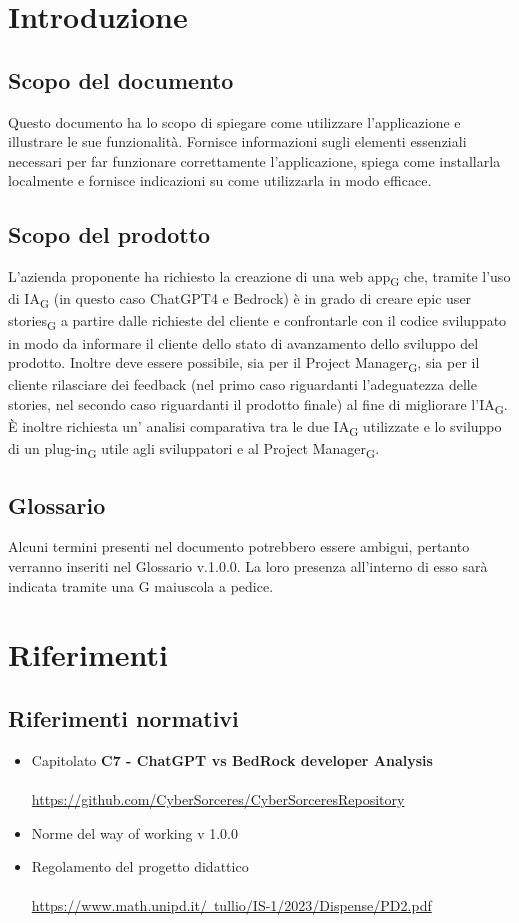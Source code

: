 \documentclass{article}
\begin{document}
{\section{Introduzione}
\subsection{Scopo del documento}
Questo documento ha lo scopo di spiegare come utilizzare l'applicazione e illustrare le sue funzionalità. Fornisce informazioni sugli elementi essenziali necessari per far funzionare correttamente l'applicazione, spiega come installarla localmente e fornisce indicazioni su come utilizzarla in modo efficace.
\subsection{Scopo del prodotto}
L'azienda proponente ha richiesto la creazione di una web app\textsubscript{G} che, tramite l'uso di IA\textsubscript{G} (in questo caso ChatGPT4 e Bedrock) è in grado di creare epic user stories\textsubscript{G} a partire dalle richieste del cliente e confrontarle con il codice sviluppato in modo da informare il cliente dello stato di avanzamento dello sviluppo del prodotto. Inoltre deve essere possibile, sia per il Project Manager\textsubscript{G}, sia per il cliente rilasciare dei feedback (nel primo caso riguardanti l'adeguatezza delle stories, nel secondo caso riguardanti il prodotto finale) al fine di migliorare l'IA\textsubscript{G}. È inoltre richiesta un' analisi comparativa tra le due IA\textsubscript{G} utilizzate e lo sviluppo di un plug-in\textsubscript{G} utile agli sviluppatori e al Project Manager\textsubscript{G}.

\subsection{Glossario}
Alcuni termini presenti nel documento potrebbero essere ambigui, pertanto verranno inseriti nel Glossario v.1.0.0. La loro presenza all'interno di esso sarà indicata tramite una G maiuscola a pedice.

\section{Riferimenti}
\subsection{Riferimenti normativi}
\begin{itemize}
    \item Capitolato \textbf{C7 - ChatGPT vs BedRock developer Analysis}
    \\ \\
       \href{https://github.com/CyberSorceres/CyberSorceresRepository}{https://github.com/CyberSorceres/CyberSorceresRepository} 
    \item Norme del way of working v 1.0.0
    \item Regolamento del progetto didattico \\ \\ \href{https://www.math.unipd.it/~tullio/IS-1/2023/Dispense/PD2.pdf} 
    {https://www.math.unipd.it/~tullio/IS-1/2023/Dispense/PD2.pdf}
\end{itemize}
}
\end{document}
